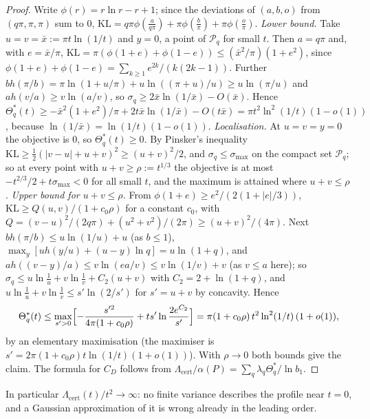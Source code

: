 \documentclass[11pt]{article}
\theoremstyle{definition}
\theoremstyle{remark}
\newcommand{\abs}[1]{\lvert #1\rvert}
\newcommand{\Hb}{h}                           %
\newcommand{\Lamcert}{\Lambda_{\mathrm{cert}}}%
\newcommand{\KL}{\mathrm{KL}}                        %
\newcommand{\Polq}{\mathcal P}                       %
\begin{document}
\begin{proof}
Write $\phi(r)=r\ln r-r+1$; since the deviations of $(a,b,o)$ from $(q\pi,\pi,\pi)$ sum to $0$, $\KL=q\pi\phi(\frac a{q\pi})+\pi\phi(\frac b\pi)+\pi\phi(\frac o\pi)$.
\emph{Lower bound.} Take $u=v=\bar x:=\pi t\ln(1/t)$ and $y=0$, a point of $\Polq_q$ for small $t$. Then $a=q\pi$ and, with $e=\bar x/\pi$, $\KL=\pi(\phi(1+e)+\phi(1-e))\le(\bar x^2/\pi)(1+e^2)$, since $\phi(1+e)+\phi(1-e)=\sum_{k\ge1}e^{2k}/(k(2k-1))$. Further $b\Hb(\pi/b)=\pi\ln(1+u/\pi)+u\ln((\pi+u)/u)\ge u\ln(\pi/u)$ and $a\Hb(v/a)\ge v\ln(a/v)$, so $\sigma_q\ge2\bar x\ln(1/\bar x)-O(\bar x)$. Hence $\Theta^*_q(t)\ge-\bar x^2(1+e^2)/\pi+2t\bar x\ln(1/\bar x)-O(t\bar x)=\pi t^2\ln^2(1/t)(1-o(1))$, because $\ln(1/\bar x)=\ln(1/t)(1-o(1))$.
\emph{Localisation.} At $u=v=y=0$ the objective is $0$, so $\Theta^*_q(t)\ge0$. By Pinsker's inequality $\KL\ge\frac12(\abs{v-u}+u+v)^2\ge(u+v)^2/2$, and $\sigma_q\le\sigma_{\max}$ on the compact set $\Polq_q$; so at every point with $u+v\ge\rho:=t^{1/3}$ the objective is at most $-t^{2/3}/2+t\sigma_{\max}<0$ for all small $t$, and the maximum is attained where $u+v\le\rho$.
\emph{Upper bound for $u+v\le\rho$.} From $\phi(1+e)\ge e^2/(2(1+\abs e/3))$, $\KL\ge Q(u,v)/(1+c_0\rho)$ for a constant $c_0$, with $Q=(v-u)^2/(2q\pi)+(u^2+v^2)/(2\pi)\ge(u+v)^2/(4\pi)$. Next $b\Hb(\pi/b)\le u\ln(1/u)+u$ (as $b\le1$), $\max_y[u\Hb(y/u)+(u-y)\ln q]=u\ln(1+q)$, and $a\Hb((v-y)/a)\le v\ln(ea/v)\le v\ln(1/v)+v$ (as $v\le a$ here); so $\sigma_q\le u\ln\frac1u+v\ln\frac1v+C_2(u+v)$ with $C_2=2+\ln(1+q)$, and $u\ln\frac1u+v\ln\frac1v\le s'\ln(2/s')$ for $s'=u+v$ by concavity. Hence
\[
\Theta^*_q(t)\le\max_{s'>0}\Bigl[-\frac{s'^2}{4\pi(1+c_0\rho)}+ts'\ln\frac{2e^{C_2}}{s'}\Bigr]=\pi(1+c_0\rho)\,t^2\ln^2(1/t)\,(1+o(1)),
\]
by an elementary maximisation (the maximiser is $s'=2\pi(1+c_0\rho)t\ln(1/t)(1+o(1))$). With $\rho\to0$ both bounds give the claim. The formula for $C_D$ follows from $\Lamcert/\alpha(P)=\sum_q\lambda_q\Theta^*_q/\ln b_1$.
\end{proof}

In particular $\Lamcert(t)/t^2\to\infty$: no finite variance describes the profile near $t=0$, and a Gaussian approximation of it is wrong already in the leading order.
\end{document}

